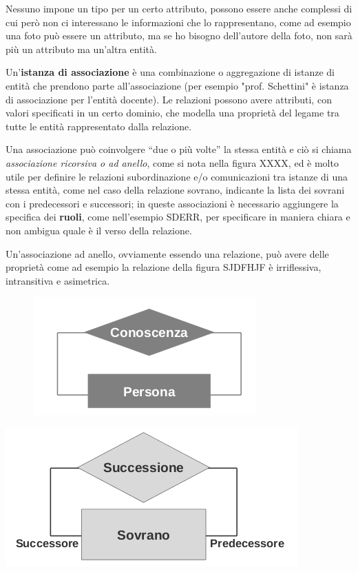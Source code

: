 \documentclass[a4paper,12pt, oneside]{book}
\begin{document}
Nessuno impone un tipo per un certo attributo, possono essere anche complessi di cui però non ci interessano le informazioni
che lo rappresentano, come ad esempio una foto può essere un attributo, ma se ho bisogno dell'autore della foto,
non sarà più un attributo ma un'altra entità. 

Un'\textbf{istanza di associazione} è una combinazione o aggregazione di istanze di entità che prendono
parte all'associazione (per esempio "prof. Schettini" è istanza di associazione per l'entità docente).\newline
Le relazioni possono avere attributi, con valori specificati in un certo dominio, che  modella una proprietà del legame
tra tutte le entità rappresentato dalla relazione.

Una associazione può coinvolgere “due o più volte” la stessa entità e ciò si chiama \emph{associazione ricorsiva o ad anello},
come si nota nella figura XXXX, ed è molto utile per definire le relazioni subordinazione e/o comunicazioni tra istanze
di una stessa entità, come nel caso della relazione sovrano, indicante la lista dei sovrani con i predecessori e successori;
in queste associazioni è necessario aggiungere la specifica dei \textbf{ruoli}, come nell'esempio SDERR, per specificare
in maniera chiara e non ambigua quale è il verso della relazione.

Un'associazione ad anello, ovviamente essendo una relazione, può avere delle proprietà come ad esempio la relazione della figura
SJDFHJF è irriflessiva, intransitiva e asimetrica.

\begin{figure}
\centering
\includegraphics[scale=2.5]{img/bas7.png}
\end{figure}

\begin{center}
    \includegraphics[scale=2.5]{img/bas8.png}
\end{center}
\end{document}
